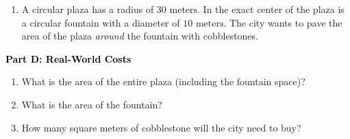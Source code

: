 \documentclass[12pt, letterpaper, fleqn]{article}
\begin{document}
\vspace{3mm}

\begin{enumerate}[itemsep=5.5cm, leftmargin=0.6cm, resume]
\item A circular plaza has a radius of $30\text{ meters}$. In the exact center of the plaza is a circular fountain with a diameter of $10\text{ meters}$. The city wants to pave the area of the plaza \textit{around} the fountain with cobblestones.
\end{enumerate}

\newpage

\begin{tcolorbox}[colback=customteal!20]
\large\textcolor{black}{\textbf{Part D: Real-World Costs}}
\end{tcolorbox}

\vspace{3mm}

\begin{enumerate}[itemsep=5.5cm, leftmargin=0.6cm, resume]
\item What is the area of the entire plaza (including the fountain space)?
\item What is the area of the fountain?
\item How many square meters of cobblestone will the city need to buy?
\end{enumerate}
\end{document}
